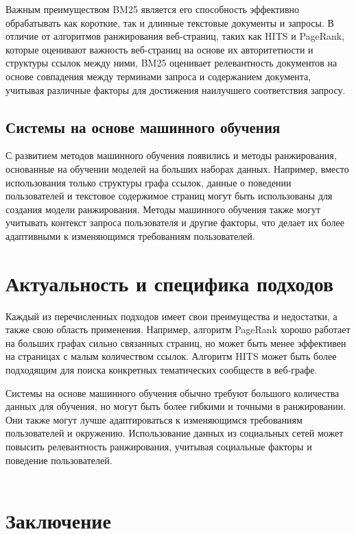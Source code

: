 \documentclass[a4paper]{article}
\begin{document}
Важным преимуществом BM25 является его способность эффективно обрабатывать как короткие, так и длинные текстовые документы и запросы. В отличие от алгоритмов ранжирования веб-страниц, таких как HITS и PageRank, которые оценивают важность веб-страниц на основе их авторитетности и структуры ссылок между ними, BM25 оценивает релевантность документов на основе совпадения между терминами запроса и содержанием документа, учитывая различные факторы для достижения наилучшего соответствия запросу.
	\newpage
	\subsection{Системы на основе машинного обучения}
	
	С развитием методов машинного обучения появились и методы ранжирования, основанные на обучении моделей на больших наборах данных. Например, вместо использования только структуры графа ссылок, данные о поведении пользователей и текстовое содержимое страниц могут быть использованы для создания модели ранжирования. Методы машинного обучения также могут учитывать контекст запроса пользователя и другие факторы, что делает их более адаптивными к изменяющимся требованиям пользователей.

	\section{Актуальность и специфика подходов}
	
	Каждый из перечисленных подходов имеет свои преимущества и недостатки, а также свою область применения. Например, алгоритм PageRank хорошо работает на больших графах сильно связанных страниц, но может быть менее эффективен на страницах с малым количеством ссылок. Алгоритм HITS может быть более подходящим для поиска конкретных тематических сообществ в веб-графе.
	
	Системы на основе машинного обучения обычно требуют большого количества данных для обучения, но могут быть более гибкими и точными в ранжировании. Они также могут лучше адаптироваться к изменяющимся требованиям пользователей и окружению. Использование данных из социальных сетей может повысить релевантность ранжирования, учитывая социальные факторы и поведение пользователей.
	\\
	\\
	\section{Заключение}
	
\end{document}
